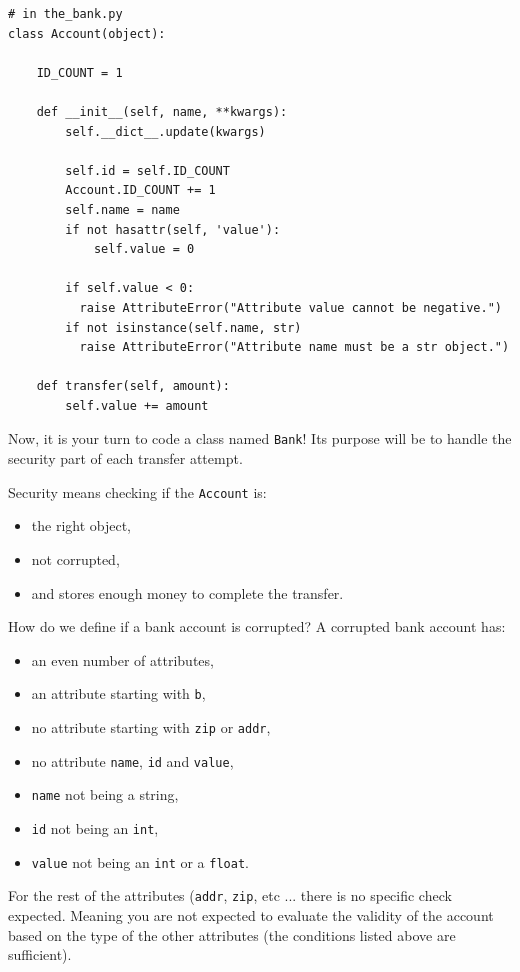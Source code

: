 \documentclass{42-en}
\begin{document}
\begin{verbatim}
# in the_bank.py
class Account(object):

    ID_COUNT = 1

    def __init__(self, name, **kwargs):
        self.__dict__.update(kwargs)
        
        self.id = self.ID_COUNT
        Account.ID_COUNT += 1
        self.name = name
        if not hasattr(self, 'value'):
            self.value = 0

        if self.value < 0:
          raise AttributeError("Attribute value cannot be negative.")
        if not isinstance(self.name, str)
          raise AttributeError("Attribute name must be a str object.")
    
    def transfer(self, amount):
        self.value += amount
\end{verbatim}

Now, it is your turn to code a class named \texttt{Bank}!
Its purpose will be to handle the security part of each transfer attempt.

Security means checking if the \texttt{Account} is:
\begin{itemize}
  \item the right object,
  \item not corrupted,
  \item and stores enough money to complete the transfer.
\end{itemize}

How do we define if a bank account is corrupted? A corrupted bank account has:
\begin{itemize}
  \item an even number of attributes,
  \item an attribute starting with \texttt{b},
  \item no attribute starting with \texttt{zip} or \texttt{addr},
  \item no attribute \texttt{name}, \texttt{id} and \texttt{value},
  \item \texttt{name} not being a string,
  \item \texttt{id} not being an \texttt{int},
  \item \texttt{value} not being an \texttt{int} or a \texttt{float}.
\end{itemize}

For the rest of the attributes (\texttt{addr}, \texttt{zip}, etc ...
there is no specific check expected.
Meaning you are not expected to evaluate the validity of the account based on the type of the other attributes (the conditions listed above are sufficient).
\end{document}
